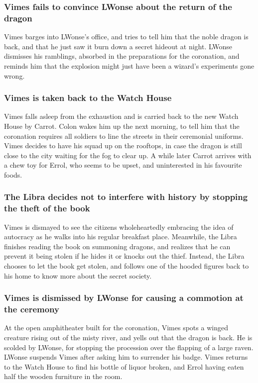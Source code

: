 \subsubsection{\Gls{Vimes} fails to convince \Gls{LWonse} about the return of the dragon}
\Gls{Vimes} barges into \Gls{LWonse}'s office, and tries to tell him that the noble dragon is back,
and that he just saw it burn down a secret hideout at night. \Gls{LWonse} dismisses his ramblings,
absorbed in the preparations for the coronation, and reminds him that the explosion might just have
been a wizard's experiments gone wrong.

\subsubsection{\Gls{Vimes} is taken back to the Watch House}
\Gls{Vimes} falls asleep from the exhaustion and is carried back to the new Watch House by
\Gls{Carrot}. \Gls{Colon} wakes him up the next morning, to tell him that the coronation requires
all soldiers to line the streets in their ceremonial uniforms. \Gls{Vimes} decides to have his squad
up on the rooftops, in case the dragon is still close to the city waiting for the fog to clear up.
A while later \Gls{Carrot} arrives with a chew toy for \Gls{Errol}, who seems to be upset, and
uninterested in his favourite foods.

\subsubsection{The \Gls{Libra} decides not to interfere with history by stopping the theft of the
    book}
\Gls{Vimes} is dismayed to see the citizens wholeheartedly embracing the idea of autocracy as he
walks into his regular breakfast place. Meanwhile, the \Gls{Libra} finishes reading the book on
summoning dragons, and realizes that he can prevent it being stolen if he hides it or knocks out the
thief. Instead, the \Gls{Libra} chooses to let the book get stolen, and follows one of the hooded
figures back to his home to know more about the secret society.

\subsubsection{\Gls{Vimes} is dismissed by \Gls{LWonse} for causing a commotion at the ceremony}
At the open amphitheater built for the coronation, \Gls{Vimes} spots a winged creature rising out
of the misty river, and yells out that the dragon is back. He is scolded by \Gls{LWonse}, for
stopping the procession over the flapping of a large raven. \Gls{LWonse} suspends \Gls{Vimes} after
asking him to surrender his badge. \Gls{Vimes} returns to the Watch House to find his bottle of
liquor broken, and \Gls{Errol} having eaten half the wooden furniture in the room.

